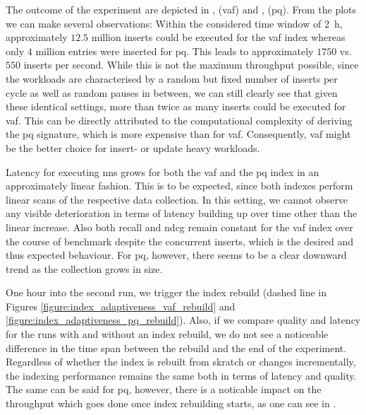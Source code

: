 The outcome of the experiment are depicted in ,  (\acrshort{vaf}) and ,  (\acrshort{pq}). From the plots we can make several observations: Within the considered time window of \SI{2}{\hour}, approximately $12.5$ million inserts could be executed for the \acrshort{vaf} index whereas only $4$ million entries were inserted for \acrshort{pq}. This leads to approximately $1750$ vs. $550$ inserts per second. While this is not the maximum throughput possible, since the workloads are characterised by a random but fixed number of inserts per cycle as well as random pauses in between, we can still clearly see that given these identical settings, more than twice as many inserts could be executed for \acrshort{vaf}. This can be directly attributed to the computational complexity of deriving the \acrshort{pq} signature, which is more expensive than for \acrshort{vaf}. Consequently, \acrshort{vaf} might be the better choice for insert- or update heavy workloads.

Latency for executing \acrshort{nns} grows for both the \acrshort{vaf} and the \acrshort{pq} index in an approximately linear fashion. This is to be expected, since both indexes perform linear scans of the respective data collection. In this setting, we cannot observe any visible deterioration in terms of latency building up over time other than the linear increase. Also both recall and n\acrshort{dcg} remain constant for the \acrshort{vaf} index over the course of benchmark despite the concurrent inserts, which is the desired and thus expected behaviour. For \acrshort{pq}, however, there seems to be a clear downward trend as the collection grows in size.

One hour into the second run, we trigger the index rebuild (dashed line in Figures \ref{figure:index_adaptiveness_vaf_rebuild} and \ref{figure:index_adaptiveness_pq_rebuild}). Also, if we compare quality and latency for the runs with and without an index rebuild, we do not see a noticeable difference in the time span between the rebuild and the end of the experiment. Regardless of whether the index is rebuilt from skratch or changes incrementally, the indexing performance remains the same both in terms of latency and quality. The same can be said for \acrshort{pq}, however, there is a noticable impact on the throughput which goes done once index rebuilding starts, as one can see in .

